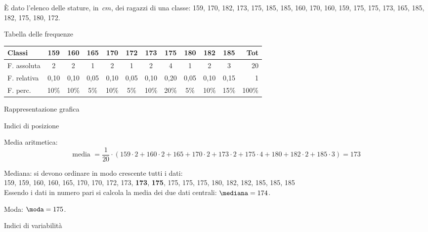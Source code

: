 \begin{esempio}

È dato l'elenco delle stature, in~\(\unit{cm}\), dei ragazzi di
una classe: 159, 170, 182, 173, 175, 185, 185, 160, 170, 160, 159, 175, 175, 
173, 165, 185, 182, 175, 180, 172.

\begin{enumeratea}
\item Tabella delle frequenze
\begin{center}
\begin{tabular}{lccccccccccr}
\toprule
Classi & 159 & 160 & 165 & 170 & 172 & 173 & 175 & 180 & 182 & 185 & Tot\\
\midrule
F. assoluta & 2 & 2 & 1 & 2 & 1 & 2 & 4 & 1 & 2 & 3  & 20\phantom{\%}\\
F. relativa & 0,10 & 0,10 & 0,05 & 0,10 & 0,05 & 0,10 & 0,20 & 
0,05 & 0,10 & 0,15 & 1\phantom{\%}\\
F. perc. & 10\% & 10\% & 5\% & 10\% & 5\% & 10\% & 20\% & 
5\% & 10\% & 15\% & 100\%\\
\end{tabular}
\end{center}
\item Rappresentazione grafica
\begin{center}
\areoese
\end{center}
\item Indici di posizione

Media aritmetica:
\[\text{media } = \frac{1}{20} \cdot 
(159 \cdot 2 + 160 \cdot 2 + 165 + 170 \cdot 2 + 173 \cdot 2 + 
175 \cdot 4 + 180 + 182 \cdot 2 + 185 \cdot 3) = 173\]

Mediana: \quad si devono ordinare in modo crescente tutti i dati:\\
159, 159, 160, 160, 165, 170, 170, 172, 173, 
\textbf{173}, \textbf{175}, 
175, 175, 175, 180, 182, 182, 185, 185, 185\\
Essendo i dati in numero pari si calcola la media dei due dati centrali:
\quad \(\mediana = 174\).

Moda: \quad
\(\moda = 175\).
\item Indici di variabilità


\end{enumeratea}
\end{esempio}
